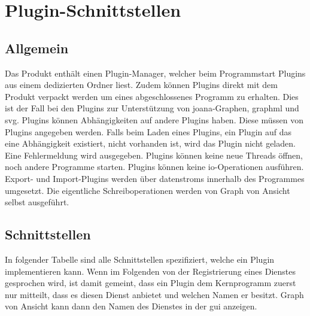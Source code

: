 \chapter{Plugin-Schnittstellen}
\label{ch:plugschnitt}

\setcounter{psnr}{10}
\newcommand{\psno}[1]{\subsubsection{#1}\addtocounter{psnr}{10}}
\renewcommand\thesubsubsection{/S\ifnum\value{psnr}<10 00\else\ifnum\value{psnr}<100 0\fi\fi\arabic{psnr}/}

\section{Allgemein}

Das Produkt enthält einen Plugin-Manager, welcher beim Programmstart Plugins aus einem dedizierten Ordner liest.
Zudem können Plugins direkt mit dem Produkt verpackt werden um eines abgeschlossenes Programm zu erhalten.
Dies ist der Fall bei den Plugins zur Unterstützung von \gls{joana}-Graphen, \gls{graphml} und \gls{svg}.
Plugins können Abhängigkeiten auf andere Plugins haben. Diese müssen von Plugins angegeben werden.
Falls beim Laden eines Plugins, ein Plugin auf das eine Abhängigkeit existiert, nicht vorhanden ist, wird das Plugin
nicht geladen. Eine Fehlermeldung wird ausgegeben.
Plugins können keine neue Threads öffnen, noch andere Programme starten. Plugins können keine \gls{io}-Operationen ausführen.
Export- und Import-Plugins werden über \glspl{datenstrom} innerhalb des Programmes umgesetzt. Die eigentliche Schreiboperationen
werden von Graph von Ansicht selbst ausgeführt.\\

\section{Schnittstellen}
In folgender Tabelle sind alle Schnittstellen spezifiziert, welche ein Plugin implementieren kann.
Wenn im Folgenden von der Registrierung eines Dienstes gesprochen wird, ist damit gemeint, dass ein Plugin dem Kernprogramm zuerst nur mitteilt, dass es diesen Dienst anbietet und welchen Namen er besitzt. Graph von Ansicht kann dann den Namen des Dienstes in der \gls{gui} anzeigen.

